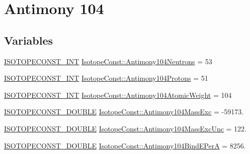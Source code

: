 \hypertarget{group___isotope_const-_antimony-_sb104}{}\section{Antimony 104}
\label{group___isotope_const-_antimony-_sb104}
\subsection*{Variables}
\begin{DoxyCompactItemize}
\item 
\mbox{\hyperlink{group___isotope_const-_macros_ga5f18360b3e99483a35c32d789e62621c}{I\+S\+O\+T\+O\+P\+E\+C\+O\+N\+S\+T\+\_\+\+I\+NT}} \mbox{\hyperlink{group___isotope_const-_antimony-_sb104_ga01624d555156cc60362c9e06ae51de28}{Isotope\+Const\+::\+Antimony104\+Neutrons}} = 53
\item 
\mbox{\hyperlink{group___isotope_const-_macros_ga5f18360b3e99483a35c32d789e62621c}{I\+S\+O\+T\+O\+P\+E\+C\+O\+N\+S\+T\+\_\+\+I\+NT}} \mbox{\hyperlink{group___isotope_const-_antimony-_sb104_gaaf119784a92fe68459be1485dde40af3}{Isotope\+Const\+::\+Antimony104\+Protons}} = 51
\item 
\mbox{\hyperlink{group___isotope_const-_macros_ga5f18360b3e99483a35c32d789e62621c}{I\+S\+O\+T\+O\+P\+E\+C\+O\+N\+S\+T\+\_\+\+I\+NT}} \mbox{\hyperlink{group___isotope_const-_antimony-_sb104_ga83fb77a88577cd4f6bbc5cb093abdba7}{Isotope\+Const\+::\+Antimony104\+Atomic\+Weight}} = 104
\item 
\mbox{\hyperlink{group___isotope_const-_macros_ga8f45a7272ce02c0b4c65c44636ed719a}{I\+S\+O\+T\+O\+P\+E\+C\+O\+N\+S\+T\+\_\+\+D\+O\+U\+B\+LE}} \mbox{\hyperlink{group___isotope_const-_antimony-_sb104_ga20a0111caea0ec3600db11cbe94d2a65}{Isotope\+Const\+::\+Antimony104\+Mass\+Exc}} = -\/59173.
\item 
\mbox{\hyperlink{group___isotope_const-_macros_ga8f45a7272ce02c0b4c65c44636ed719a}{I\+S\+O\+T\+O\+P\+E\+C\+O\+N\+S\+T\+\_\+\+D\+O\+U\+B\+LE}} \mbox{\hyperlink{group___isotope_const-_antimony-_sb104_ga397094b29c8215ae4897076d811b927a}{Isotope\+Const\+::\+Antimony104\+Mass\+Exc\+Unc}} = 122.
\item 
\mbox{\hyperlink{group___isotope_const-_macros_ga8f45a7272ce02c0b4c65c44636ed719a}{I\+S\+O\+T\+O\+P\+E\+C\+O\+N\+S\+T\+\_\+\+D\+O\+U\+B\+LE}} \mbox{\hyperlink{group___isotope_const-_antimony-_sb104_gab7bef305609c4fb7517a3df974932b47}{Isotope\+Const\+::\+Antimony104\+Bind\+E\+PerA}} = 8256.
\item 

\end{DoxyCompactItemize}
